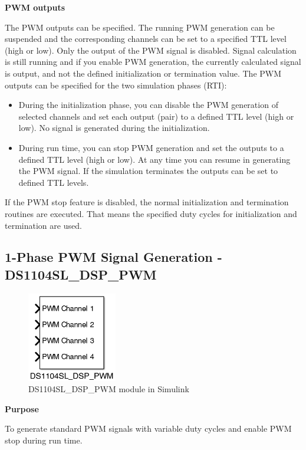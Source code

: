 \noindent \textbf{PWM outputs}\par
The PWM outputs can be specified. The running PWM generation can be suspended and the corresponding channels can be set to a specified TTL level (high or low). Only the output of the PWM signal is disabled. Signal calculation is still running and if you enable PWM generation, the currently calculated signal is output, and not the defined initialization or termination value. The PWM outputs can be specified for the two simulation phases (RTI):
\begin{itemize}
    \item During the initialization phase, you can disable the PWM generation of selected channels and set each output (pair) to a defined TTL level (high or low). No signal is generated during the initialization.
    \item During run time, you can stop PWM generation and set the outputs to a defined TTL level (high or low). At any time you can resume in generating the PWM signal. If the simulation terminates the outputs can be set to defined TTL levels.
\end{itemize}

If the PWM stop feature is disabled, the normal initialization and termination routines are executed. That means the specified duty cycles for initialization and termination are used.

\subsection{1-Phase PWM Signal Generation - DS1104SL\_DSP\_PWM}

    \begin{figure}[H]
        \centering
        \includegraphics[width=0.35\textwidth]{Images/Ball and Bean/MatLab14.png}
        \caption{DS1104SL\_DSP\_PWM module in Simulink}
        \label{fig15}
    \end{figure}

\noindent \textbf{Purpose}\par
To generate standard PWM signals with variable duty cycles and enable PWM stop during run time.

